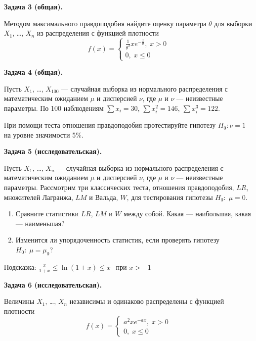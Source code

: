 \documentclass[12pt, a4paper]{article}\usepackage[]{graphicx}\usepackage[]{color}
\begin{document}
\textbf{Задача 3 (общая).}


Методом максимального правдоподобия найдите оценку параметра $\theta$ для выборки $X_1$, \ldots, $X_n$ из распределения с функцией плотности
\[
f(x)=\begin{cases}
\frac{1}{\theta^2}xe^{-\frac{x}{\theta}}, \; x>0 \\
0, \; x\leq 0
\end{cases}
\]

\vspace{0.5cm}

\textbf{Задача 4 (общая).}

Пусть $X_1$, \ldots, $X_{100}$ — случайная выборка из нормального распределения с математическим ожиданием $\mu$ и дисперсией $\nu$, где $\mu$ и $\nu$ — неизвестные параметры. По 100 наблюдениям $\sum x_i=30$, $\sum x_i^2=146$, $\sum x_i^3=122$.

При помощи теста отношения правдоподобия протестируйте гипотезу $H_0: \nu=1$ на уровне значимости 5\%.


\textbf{Задача 5 (исследовательская).}

\vspace{0.1cm}

Пусть $X_1$, \ldots, $X_{n}$ — случайная выборка из нормального распределения с математическим ожиданием $\mu$ и дисперсией $\nu$, где $\mu$ и $\nu$ — неизвестные параметры. Рассмотрим три классических теста, отношения правдоподобия, $LR$, множителей Лагранжа, $LM$ и Вальда, $W$, для тестирования гипотезы $H_0: \; \mu=0$.

\begin{enumerate}
\item Сравните  статистики $LR$, $LM$ и $W$ между собой. Какая — наибольшая, какая — наименьшая?
\item Изменится ли упорядоченность статистик, если проверять гипотезу $H_0: \; \mu=\mu_0$?
\end{enumerate}

\vspace{0.5cm}

Подсказка: $
\frac{x}{1+x} \leq \ln(1+x) \leq x\, \; \text{ при } x>-1
$

\vspace{0.5cm}

\textbf{Задача 6 (исследовательская).}
\thispagestyle{empty}
\vspace{0.1cm}

Величины $X_1$, \ldots, $X_n$ независимы и одинаково распределены с функцией плотности
\[
f(x)=\begin{cases}
a^2xe^{-ax}, \; x>0 \\
0, \; x\leq 0
\end{cases}
\]
\end{document}
